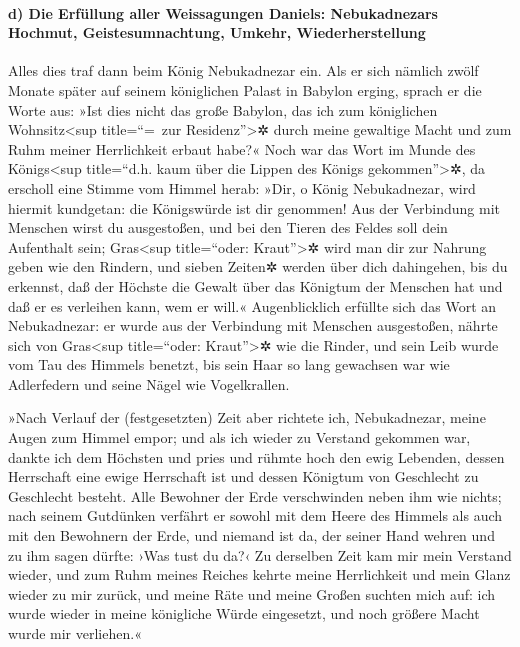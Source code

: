 \hypertarget{d-die-erfuxfcllung-aller-weissagungen-daniels-nebukadnezars-hochmut-geistesumnachtung-umkehr-wiederherstellung}{%
\paragraph{d) Die Erfüllung aller Weissagungen Daniels: Nebukadnezars
Hochmut, Geistesumnachtung, Umkehr,
Wiederherstellung}\label{d-die-erfuxfcllung-aller-weissagungen-daniels-nebukadnezars-hochmut-geistesumnachtung-umkehr-wiederherstellung}}

Alles dies traf dann beim König Nebukadnezar ein.
Als er sich nämlich zwölf Monate später auf seinem
königlichen Palast in Babylon erging, sprach er die Worte
aus: »Ist dies nicht das große Babylon, das ich zum königlichen
Wohnsitz\textless sup title=``=~zur Residenz''\textgreater✲ durch meine
gewaltige Macht und zum Ruhm meiner Herrlichkeit erbaut habe?«
Noch war das Wort im Munde des Königs\textless sup
title=``d.h. kaum über die Lippen des Königs gekommen''\textgreater✲, da
erscholl eine Stimme vom Himmel herab: »Dir, o König Nebukadnezar, wird
hiermit kundgetan: die Königswürde ist dir genommen! Aus
der Verbindung mit Menschen wirst du ausgestoßen, und bei den Tieren des
Feldes soll dein Aufenthalt sein; Gras\textless sup title=``oder:
Kraut''\textgreater✲ wird man dir zur Nahrung geben wie den Rindern, und
sieben Zeiten✲ werden über dich dahingehen, bis du erkennst, daß der
Höchste die Gewalt über das Königtum der Menschen hat und daß er es
verleihen kann, wem er will.« Augenblicklich erfüllte
sich das Wort an Nebukadnezar: er wurde aus der Verbindung mit Menschen
ausgestoßen, nährte sich von Gras\textless sup title=``oder:
Kraut''\textgreater✲ wie die Rinder, und sein Leib wurde vom Tau des
Himmels benetzt, bis sein Haar so lang gewachsen war wie Adlerfedern und
seine Nägel wie Vogelkrallen.

»Nach Verlauf der (festgesetzten) Zeit aber richtete ich,
Nebukadnezar, meine Augen zum Himmel empor; und als ich wieder zu
Verstand gekommen war, dankte ich dem Höchsten und pries und rühmte hoch
den ewig Lebenden, dessen Herrschaft eine ewige Herrschaft ist und
dessen Königtum von Geschlecht zu Geschlecht besteht.
Alle Bewohner der Erde verschwinden neben ihm wie nichts;
nach seinem Gutdünken verfährt er sowohl mit dem Heere des Himmels als
auch mit den Bewohnern der Erde, und niemand ist da, der seiner Hand
wehren und zu ihm sagen dürfte: ›Was tust du da?‹ Zu
derselben Zeit kam mir mein Verstand wieder, und zum Ruhm meines Reiches
kehrte meine Herrlichkeit und mein Glanz wieder zu mir zurück, und meine
Räte und meine Großen suchten mich auf: ich wurde wieder in meine
königliche Würde eingesetzt, und noch größere Macht wurde mir
verliehen.«

